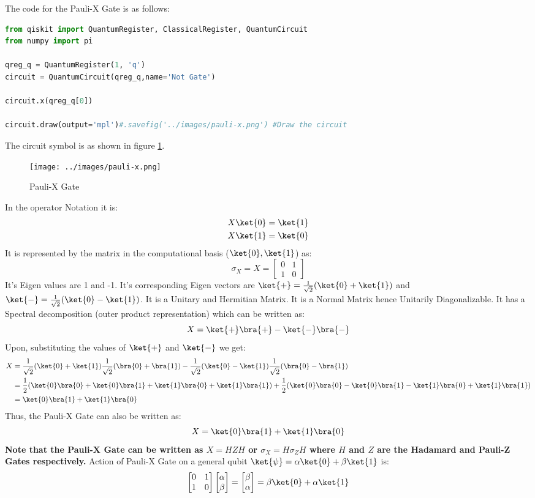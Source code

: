 \documentclass[12pt, oneside]{book}
\theoremstyle{definition}
\theoremstyle{definition}
\theoremstyle{remark}
\begin{document}
The code for the Pauli-X Gate is as follows:
\begin{lstlisting}[language=Python]
from qiskit import QuantumRegister, ClassicalRegister, QuantumCircuit
from numpy import pi

qreg_q = QuantumRegister(1, 'q')
circuit = QuantumCircuit(qreg_q,name='Not Gate')

circuit.x(qreg_q[0])

circuit.draw(output='mpl')#.savefig('../images/pauli-x.png') #Draw the circuit
\end{lstlisting}
The circuit symbol is as shown in figure \ref{fig:pauli-x}.
\begin{figure}[H]
    \centering
    \texttt{[image: ../images/pauli-x.png]}
    \caption{Pauli-X Gate}
    \label{fig:pauli-x}
\end{figure}
In the operator Notation it is:
\begin{align*}
    X\ket{0}&=\ket{1} \\
    X\ket{1}&=\ket{0}
\end{align*}
It is represented by the matrix in the computational basis ($\ket{0},\ket{1}$) as:
\[
    \sigma_X=X=\begin{bmatrix}
        0 & 1 \\
        1 & 0
    \end{bmatrix}
\]
It's Eigen values are 1 and -1. It's corresponding Eigen vectors are $\ket{+}=\frac{1}{\sqrt{2}}(\ket{0}+\ket{1})$ and $\ket{-}=\frac{1}{\sqrt{2}}(\ket{0}-\ket{1})$.
It is a Unitary and Hermitian Matrix. It is a Normal Matrix hence Unitarily Diagonalizable.
It has a Spectral decomposition (outer product representation) which can be written as:
\[
    X=\ket{+}\bra{+}-\ket{-}\bra{-}
\]
Upon, substituting the values of $\ket{+}$ and $\ket{-}$ we get:
\begin{align*}
    X&=\dfrac{1}{\sqrt{2}}(\ket{0}+\ket{1})\dfrac{1}{\sqrt{2}}(\bra{0}+\bra{1})-\dfrac{1}{\sqrt{2}}(\ket{0}-\ket{1})\dfrac{1}{\sqrt{2}}(\bra{0}-\bra{1})\\
    &=\dfrac{1}{2}(\ket{0}\bra{0}+\ket{0}\bra{1}+\ket{1}\bra{0}+\ket{1}\bra{1})+\dfrac{1}{2}(\ket{0}\bra{0}-\ket{0}\bra{1}-\ket{1}\bra{0}+\ket{1}\bra{1})\\
    &=\ket{0}\bra{1}+\ket{1}\bra{0}
\end{align*}
Thus, the Pauli-X Gate can also be written as:
\[
    X=\ket{0}\bra{1}+\ket{1}\bra{0}
\]
\textbf{Note that the Pauli-X Gate can be written as $X=HZH$ or $\sigma_X=H\sigma_Z H$  where $H$ and $Z$ are the Hadamard and Pauli-Z Gates respectively.}
Action of Pauli-X Gate on a general qubit $\ket{\psi}=\alpha\ket{0}+\beta\ket{1}$ is: 
\[
    \begin{bmatrix}
        0 & 1 \\
        1 & 0
    \end{bmatrix}\begin{bmatrix}
        \alpha \\
        \beta
    \end{bmatrix}=\begin{bmatrix}
        \beta \\
        \alpha
    \end{bmatrix}= \beta\ket{0}+\alpha\ket{1}
\]
\end{document}
